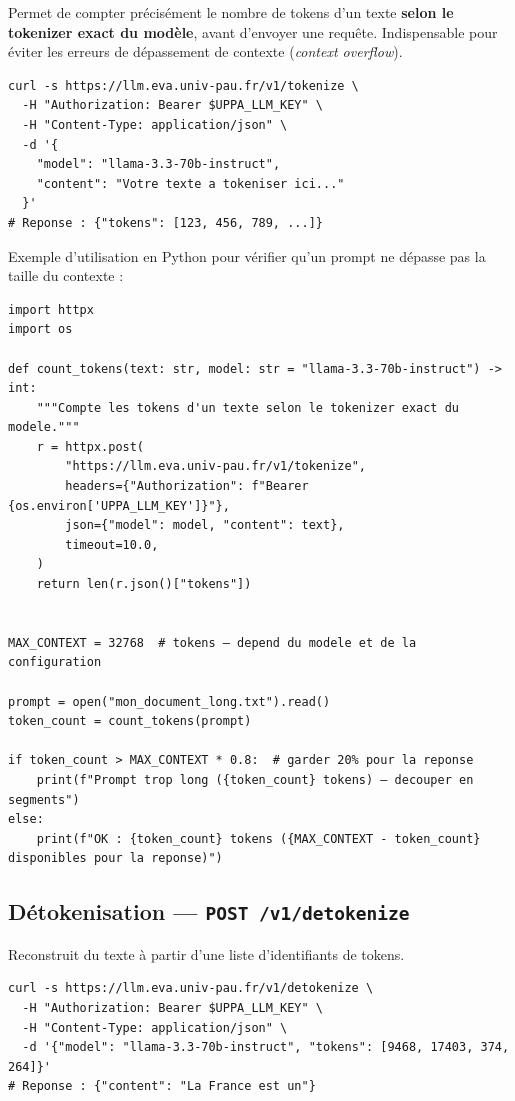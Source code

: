 \documentclass[12pt, a4paper, twoside]{article}
\begin{document}
Permet de compter précisément le nombre de tokens d'un texte \textbf{selon le tokenizer exact
du modèle}, avant d'envoyer une requête. Indispensable pour éviter les erreurs de dépassement
de contexte (\textit{context overflow}).

\begin{lstlisting}[style=bashstyle, caption={Compter les tokens d'un texte}]
curl -s https://llm.eva.univ-pau.fr/v1/tokenize \
  -H "Authorization: Bearer $UPPA_LLM_KEY" \
  -H "Content-Type: application/json" \
  -d '{
    "model": "llama-3.3-70b-instruct",
    "content": "Votre texte a tokeniser ici..."
  }'
# Reponse : {"tokens": [123, 456, 789, ...]}
\end{lstlisting}

Exemple d'utilisation en Python pour vérifier qu'un prompt ne dépasse pas la taille du contexte :

\begin{lstlisting}[style=pythonstyle, caption={Vérification de la taille du prompt avant envoi}]
import httpx
import os

def count_tokens(text: str, model: str = "llama-3.3-70b-instruct") -> int:
    """Compte les tokens d'un texte selon le tokenizer exact du modele."""
    r = httpx.post(
        "https://llm.eva.univ-pau.fr/v1/tokenize",
        headers={"Authorization": f"Bearer {os.environ['UPPA_LLM_KEY']}"},
        json={"model": model, "content": text},
        timeout=10.0,
    )
    return len(r.json()["tokens"])


MAX_CONTEXT = 32768  # tokens — depend du modele et de la configuration

prompt = open("mon_document_long.txt").read()
token_count = count_tokens(prompt)

if token_count > MAX_CONTEXT * 0.8:  # garder 20% pour la reponse
    print(f"Prompt trop long ({token_count} tokens) — decouper en segments")
else:
    print(f"OK : {token_count} tokens ({MAX_CONTEXT - token_count} disponibles pour la reponse)")
\end{lstlisting}

\subsection{Détokenisation — \texttt{POST /v1/detokenize}}

Reconstruit du texte à partir d'une liste d'identifiants de tokens.

\begin{lstlisting}[style=bashstyle, caption={Détokenisation}]
curl -s https://llm.eva.univ-pau.fr/v1/detokenize \
  -H "Authorization: Bearer $UPPA_LLM_KEY" \
  -H "Content-Type: application/json" \
  -d '{"model": "llama-3.3-70b-instruct", "tokens": [9468, 17403, 374, 264]}'
# Reponse : {"content": "La France est un"}
\end{lstlisting}
\end{document}

